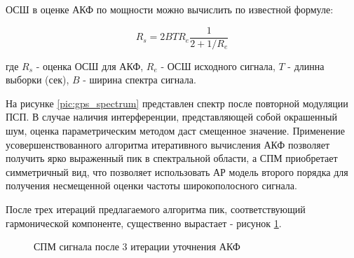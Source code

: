 ОСШ в оценке АКФ по мощности можно вычислить по известной формуле:
\begin{center}
\begin{equation}
	\label{eq:akf_max_eq}
	R_s=2 B T R_e \frac{1}{2+1/R_e}
\end{equation}
\end{center}
где ${R_s}$ - оценка ОСШ для АКФ, ${R_e}$ - ОСШ исходного сигнала, ${T}$ - длинна выборки (сек), ${B}$ -  ширина спектра сигнала.

На рисунке \ref{pic:gps_spectrum} представлен спектр после повторной
модуляции ПСП. В случае наличия интерференции, представляющей собой окрашенный шум, оценка параметрическим методом даст смещенное значение.
Применение усовершенствованного алгоритма итеративного вычисления АКФ позволяет получить ярко выраженный пик в спектральной области,
а СПМ приобретает симметричный вид, что позволяет использовать АР модель второго порядка для получения несмещенной оценки частоты
широкополосного сигнала.

После трех 
итераций предлагаемого алгоритма пик, соответствующий гармонической компоненте, существенно вырастает - рисунок \ref{pic:GPS_spectrum_iter3}.
\begin{figure}[h]
	\center{}
	\caption{СПМ сигнала после 3 итерации уточнения АКФ}
	\label{pic:GPS_spectrum_iter3}
\end{figure}

